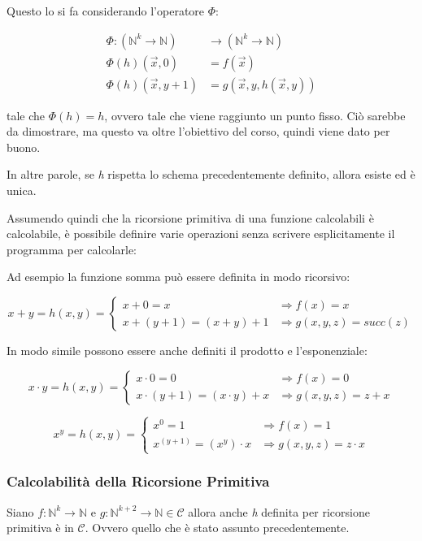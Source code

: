 Questo lo si fa considerando l'operatore $\Phi$:

\begin{align*}
	\Phi : (\mathbb{N}^k \rightarrow \mathbb{N}) &\rightarrow (\mathbb{N}^k \rightarrow \mathbb{N}) \\
	\Phi(h)(\vec{x}, 0) &= f(\vec{x}) \\
	\Phi(h)(\vec{x}, y+1) &= g(\vec{x}, y, h(\vec{x},y))
\end{align*}

tale che $\Phi(h) = h$, ovvero tale che viene raggiunto un punto
fisso. Ciò sarebbe da dimostrare, ma questo va oltre l'obiettivo del corso, quindi viene dato per buono.

In altre parole, se \emph{h} rispetta lo schema precedentemente definito, allora esiste ed è unica.

Assumendo quindi che la ricorsione primitiva di una funzione calcolabili
è calcolabile, è possibile definire varie operazioni senza scrivere
esplicitamente il programma per calcolarle:

Ad esempio la funzione somma può essere definita in modo ricorsivo:

$$
	x+y = h(x,y) =\begin{cases}
	x+0 = x &\Rightarrow f(x) = x \\
	x+(y+1) = (x+y) + 1 &\Rightarrow g(x,y,z) = succ(z)
	\end{cases}
$$

In modo simile possono essere anche definiti il prodotto e l'esponenziale:

$$
x \cdot y = h(x,y) =\begin{cases}
x \cdot 0 = 0 &\Rightarrow f(x) = 0 \\
x \cdot (y+1) = (x \cdot y) + x &\Rightarrow g(x,y,z) = z+x
\end{cases}
$$

$$
x^y = h(x,y) =\begin{cases}
x^0 = 1 &\Rightarrow f(x) = 1 \\
x^{(y+1)} = (x^y) \cdot x &\Rightarrow g(x,y,z) = z \cdot x
\end{cases}
$$

\subsubsection{Calcolabilità della Ricorsione Primitiva}\label{calcolabilituxe0-della-ricorsione-primitiva}

Siano $f:\mathbb{N}^k \rightarrow \mathbb{N}$ e $g:\mathbb{N}^{k+2} \rightarrow \mathbb{N} \in \mathcal{C}$ allora anche \emph{h} definita per
ricorsione primitiva è in $\mathcal{C}$. Ovvero quello che è stato assunto precedentemente.


